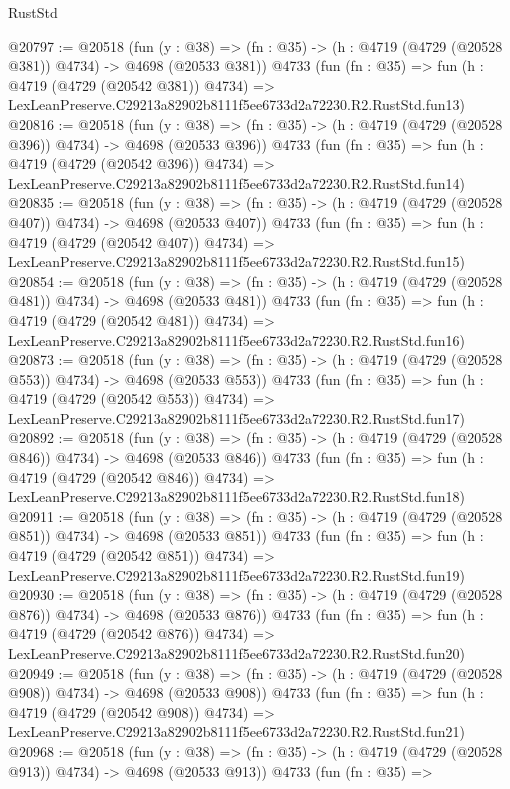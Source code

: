 \begin{lexlean}{RustStd}
\begin{coremodule}
@20797 := @20518
    (fun (y : @38) => (fn : @35) -> (h : @4719 (@4729 (@20528 @381)) @4734) -> @4698 (@20533 @381))
    @4733
    (fun (fn : @35) =>
    fun (h : @4719 (@4729 (@20542 @381)) @4734) =>
    LexLeanPreserve.C29213a82902b8111f5ee6733d2a72230.R2.RustStd.fun13)
@20816 := @20518
    (fun (y : @38) => (fn : @35) -> (h : @4719 (@4729 (@20528 @396)) @4734) -> @4698 (@20533 @396))
    @4733
    (fun (fn : @35) =>
    fun (h : @4719 (@4729 (@20542 @396)) @4734) =>
    LexLeanPreserve.C29213a82902b8111f5ee6733d2a72230.R2.RustStd.fun14)
@20835 := @20518
    (fun (y : @38) => (fn : @35) -> (h : @4719 (@4729 (@20528 @407)) @4734) -> @4698 (@20533 @407))
    @4733
    (fun (fn : @35) =>
    fun (h : @4719 (@4729 (@20542 @407)) @4734) =>
    LexLeanPreserve.C29213a82902b8111f5ee6733d2a72230.R2.RustStd.fun15)
@20854 := @20518
    (fun (y : @38) => (fn : @35) -> (h : @4719 (@4729 (@20528 @481)) @4734) -> @4698 (@20533 @481))
    @4733
    (fun (fn : @35) =>
    fun (h : @4719 (@4729 (@20542 @481)) @4734) =>
    LexLeanPreserve.C29213a82902b8111f5ee6733d2a72230.R2.RustStd.fun16)
@20873 := @20518
    (fun (y : @38) => (fn : @35) -> (h : @4719 (@4729 (@20528 @553)) @4734) -> @4698 (@20533 @553))
    @4733
    (fun (fn : @35) =>
    fun (h : @4719 (@4729 (@20542 @553)) @4734) =>
    LexLeanPreserve.C29213a82902b8111f5ee6733d2a72230.R2.RustStd.fun17)
@20892 := @20518
    (fun (y : @38) => (fn : @35) -> (h : @4719 (@4729 (@20528 @846)) @4734) -> @4698 (@20533 @846))
    @4733
    (fun (fn : @35) =>
    fun (h : @4719 (@4729 (@20542 @846)) @4734) =>
    LexLeanPreserve.C29213a82902b8111f5ee6733d2a72230.R2.RustStd.fun18)
@20911 := @20518
    (fun (y : @38) => (fn : @35) -> (h : @4719 (@4729 (@20528 @851)) @4734) -> @4698 (@20533 @851))
    @4733
    (fun (fn : @35) =>
    fun (h : @4719 (@4729 (@20542 @851)) @4734) =>
    LexLeanPreserve.C29213a82902b8111f5ee6733d2a72230.R2.RustStd.fun19)
@20930 := @20518
    (fun (y : @38) => (fn : @35) -> (h : @4719 (@4729 (@20528 @876)) @4734) -> @4698 (@20533 @876))
    @4733
    (fun (fn : @35) =>
    fun (h : @4719 (@4729 (@20542 @876)) @4734) =>
    LexLeanPreserve.C29213a82902b8111f5ee6733d2a72230.R2.RustStd.fun20)
@20949 := @20518
    (fun (y : @38) => (fn : @35) -> (h : @4719 (@4729 (@20528 @908)) @4734) -> @4698 (@20533 @908))
    @4733
    (fun (fn : @35) =>
    fun (h : @4719 (@4729 (@20542 @908)) @4734) =>
    LexLeanPreserve.C29213a82902b8111f5ee6733d2a72230.R2.RustStd.fun21)
@20968 := @20518
    (fun (y : @38) => (fn : @35) -> (h : @4719 (@4729 (@20528 @913)) @4734) -> @4698 (@20533 @913))
    @4733
    (fun (fn : @35) =>

\end{coremodule}
\end{lexlean}
